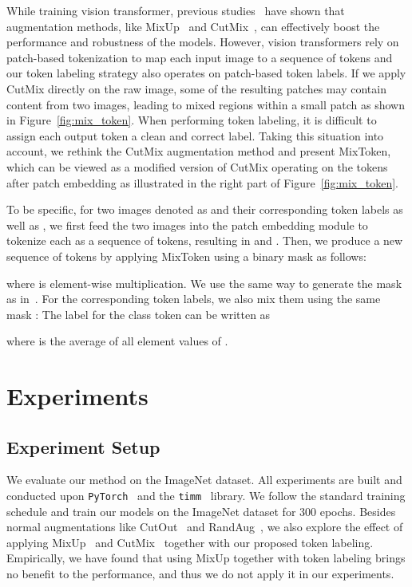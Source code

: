 \documentclass{article}
\begin{document}
While training vision transformer, previous studies~\cite{touvron2020training, yuan2021tokens} 
have shown that augmentation methods, like MixUp~\cite{zhang2017mixup} and CutMix~\cite{yun2019cutmix},
can effectively boost the performance and robustness of the models.
However, vision transformers rely on patch-based tokenization to map each input image to a sequence of tokens
and our token labeling strategy also operates on patch-based token labels.
If we apply CutMix directly on the raw image, some of the resulting patches may contain 
content from two images, leading to mixed regions within a small patch as shown in Figure~\ref{fig:mix_token}.
When performing token labeling, it is difficult to assign each output token a clean and correct label.
Taking this situation into account, we rethink the CutMix augmentation method and present MixToken, 
which can be viewed as a modified version of CutMix operating on the tokens after patch embedding
as illustrated in the right part of Figure~\ref{fig:mix_token}. 

To be specific, for two images denoted as  and their corresponding token labels 
as well as , we first feed the two images into the patch embedding module to 
tokenize each as a sequence of tokens, resulting in  and . 
Then, we produce a new sequence of tokens by applying MixToken using a binary mask  as follows:

where  is element-wise multiplication. We use the same way to generate the mask 
as in~\cite{yun2019cutmix}.
For the corresponding token labels, we also mix them using the same mask : 
The label for the class token can be written as

where  is the average of all element values of .



\section{Experiments}


\subsection{Experiment Setup}

We evaluate our method on the ImageNet \cite{deng2009imagenet} dataset.
All experiments are built and conducted upon \texttt{PyTorch}~\cite{paszke2019pytorch} and the \texttt{timm}~\cite{rw2019timm} library.
We follow the standard training schedule and train our models on the ImageNet dataset for 300 epochs.
Besides normal augmentations like CutOut~\cite{zhong2020random} and RandAug~\cite{cubuk2020randaugment}, 
we also explore the effect of applying MixUp~\cite{zhang2017mixup} and CutMix~\cite{yun2019cutmix} together
with our proposed token labeling.
Empirically, we have found that using MixUp together with token labeling brings no benefit to the performance, and thus we do not apply it in our experiments.
\end{document}

